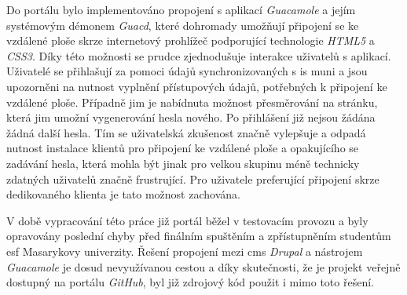 Do portálu bylo implementováno propojení s aplikací \emph{Guacamole} a jejím systémovým démonem \emph{Guacd}, které dohromady umožňují připojení se ke vzdálené ploše skrze internetový prohlížeč podporující technologie \emph{HTML5} a \emph{CSS3}. Díky této možnosti se prudce zjednodušuje interakce uživatelů s aplikací. Uživatelé se přihlašují za pomoci údajů synchronizovaných s \gls{is} \gls{muni} a jsou upozorněni na nutnost vyplnění přístupových údajů, potřebných k připojení ke vzdálené ploše. Případně jim je nabídnuta možnost přesměrování na stránku, která jim umožní vygenerování hesla nového. Po přihlášení již nejsou žádána žádná další hesla. Tím se uživatelská zkušenost značně vylepšuje a odpadá nutnost instalace klientů pro připojení ke vzdálené ploše a opakujícího se zadávání hesla, která mohla být jinak pro velkou skupinu méně technicky zdatných uživatelů značně frustrující. Pro uživatele preferující připojení skrze dedikovaného klienta je tato možnost zachována.

V době vypracování této práce již portál běžel v testovacím provozu a byly opravovány poslední chyby před finálním spuštěním a zpřístupněním studentům \gls{esf} Masarykovy univerzity. Řešení propojení mezi \gls{cms} \emph{Drupal} a nástrojem \emph{Guacamole} je dosud nevyužívanou cestou a díky skutečnosti, že je projekt veřejně dostupný na portálu \emph{GitHub}, byl již zdrojový kód použit i mimo toto řešení.
